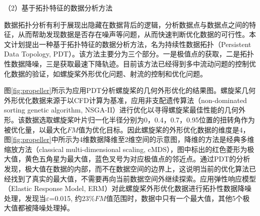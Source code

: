 

（2）基于拓扑特征的数据分析方法

数据拓扑分析有利于展现出隐藏在数据背后的逻辑，分析数据点与数据点之间的特征，从而帮助发现数据是否存在噪声等问题，从而快速判断优化数据的可行性。本文计划提出一种基于拓扑特征的数据分析方法，名为持续性数据拓扑（Persistent Data Topology, PDT）。该方法主要分为三个部分。一是极值点的获取，二是拓扑性数据降噪，三是获取最速下降轨迹。目前该方法已经得到多中流动问题的控制优化数据的验证，如螺旋桨外形优化问题、射流的控制和优化问题。

图\ref{fig:propeller}所示为应用PDT分析螺旋桨的几何外形优化的结果图。螺旋桨几何外形优化数据来源于以CFD计算为基准，应用非支配遗传算法（non-dominated sorting genetic algorithm, NSGA-II）进行优化以寻得螺旋桨最佳性能的几何外形\cite{WangTY2023}。该数据选取螺旋桨叶片归一化半径分别为0，0.4，0.7，0.95位置的扭转角作为被优化量，以最大化$FM$值为优化目标。因此螺旋桨的外形优化数据的维度是4，图\ref{fig:propeller}中所示为4维数据降维至2维空间的示意图，降维的方法是经典多维缩放方法（classical multi-dimensional scaling, cMDS），图中标出的红色菱形为极大值，黄色五角星为最大值，蓝色叉号为对应极值点的邻近点。通过PDT的分析发现，极大值在数据的内部，而不在数据空间的边界上，这说明当前的优化算法已经找到了真实的最大值，不需要再向当前数据空间外继续探索。应用弹性响应模型（Elastic Response Model, ERM）对此螺旋桨外形优化数据进行拓扑性数据降噪处理，发现当$\varepsilon$=0.015, 约23\%$FM$值范围时，数据中只有一个最大值，其他5个极大值都被降噪处理掉。



